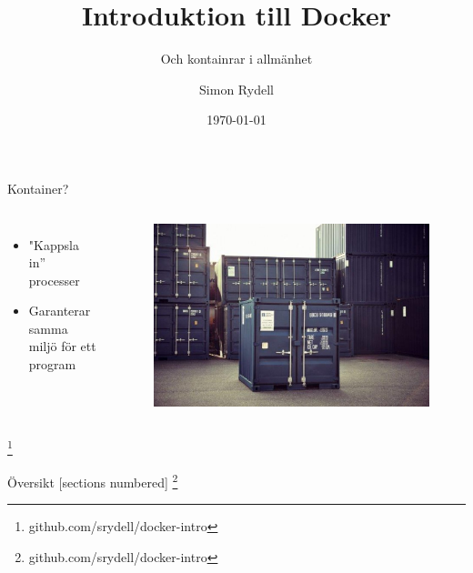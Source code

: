 \documentclass[12pt]{beamer}
\title{Introduktion till Docker}
\subtitle{Och kontainrar i allmänhet}
\date{\today}
\author{Simon Rydell}
\newcommand\blfootnote[1]{%
  \begingroup
  \renewcommand\thefootnote{}\footnote{#1}%
  \addtocounter{footnote}{-1}%
  \endgroup
}
\begin{document}
\begin{frame}
\titlepage
\end{frame}


% 
\begin{frame}{Kontainer?}
    \begin{columns}
        \column{.25in}
        \column{2in}
        \begin{itemize}
            \item "Kappsla in'' processer
            \item Garanterar samma miljö för ett program
        \end{itemize}
        \column{2.5in}
            \begin{figure}[h!]
                \centering
                \includegraphics[width=.8\textwidth]{../figures/one_container.jpg}
            \end{figure}
    \end{columns}
     \blfootnote{github.com/srydell/docker-intro}
\end{frame}

% 
\begin{frame}{Översikt}
    [sections numbered]
    \tableofcontents[hideallsubsections]
    \blfootnote{github.com/srydell/docker-intro}
\end{frame}
\end{document}
